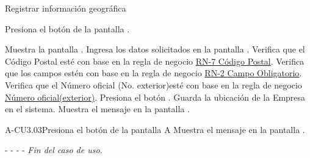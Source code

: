 	\begin{UCtrayectoria}{Registrar información geográfica }

		\UCpaso[\UCactor] Presiona el botón   de la pantalla .

		\UCpaso[\UCsist] Muestra la pantalla .
	    \UCpaso[\UCactor] Ingresa los datos solicitados en la pantalla .
	    \UCpaso[\UCsist] Verifica que el Código Postal esté con base en la regla de negocio \hyperlink{RN7}{RN-7 C\'odigo Postal}. 
	    \UCpaso[\UCsist] Verifica que los campos estén con base en la regla de negocio \hyperlink{RN2}{RN-2 Campo Obligatorio}. 
	    \UCpaso[\UCsist] Verifica que el Número oficial (No. exterior)esté con base en la regla de negocio \hyperlink{RN12}{Número oficial(exterior)}. 
		\UCpaso[\UCactor] Presiona el botón . 
		\UCpaso[\UCsist] Guarda la ubicación de la Empresa en el sistema. 
		\UCpaso[\UCsist] Muestra el mensaje  en la pantalla .

		
	\end{UCtrayectoria}
	

	
	

	
	

	\begin{UCtrayectoriaA}{A-CU3.03}{Presiona el botón  de la pantalla }{A}
		\UCpaso[\UCsist] Muestra el mensaje  en la pantalla .
		\item[- -] - - {\em Fin del caso de uso.} 
	\end{UCtrayectoriaA}

